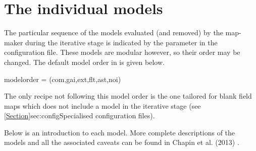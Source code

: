 \raggedbottom
\section{The individual models}
\label{sec:models}

The particular sequence of the models evaluated (and removed) by the
map-maker during the iterative stage is indicated by the
 parameter in the configuration file. These models
are modular however, so their order may be changed. The default model
order in  is given below.


\begin{terminalv}
modelorder = (com,gai,ext,flt,ast,noi)
\end{terminalv}


The only recipe not following this model order is the one tailored for
blank field maps which does not include a  model in the
iterative stage (see \cref{Section}{sec:config}{Specialised
  configuration files}).

Below is an introduction to each model. More complete descriptions of
the models and all the associated caveats can be found in Chapin et
al.  (2013) \cite{mapmaker}.


